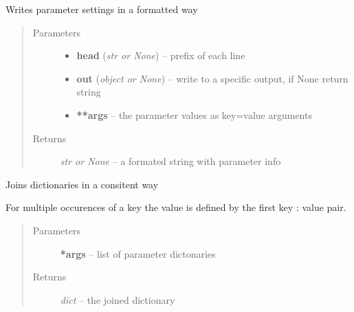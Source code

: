 \documentclass[letterpaper,10pt,english]{sphinxmanual}
\begin{document}
\begin{fulllineitems}
\label{api/ClearMap.Utils:ClearMap.Utils.ParameterTools.writeParameter}
Writes parameter settings in a formatted way
\begin{quote}\begin{description}
\item[{Parameters}] \leavevmode\begin{itemize}
\item {} 
\textbf{head} (\emph{str or None}) --
prefix of each line

\item {} 
\textbf{out} (\emph{object or None}) --
write to a specific output, if None return string

\item {} 
\textbf{**args} --
the parameter values as key=value arguments

\end{itemize}

\item[{Returns}] \leavevmode
\emph{str or None} --
a formated string with parameter info

\end{description}\end{quote}

\end{fulllineitems}


\begin{fulllineitems}
\label{api/ClearMap.Utils:ClearMap.Utils.ParameterTools.joinParameter}
Joins dictionaries in a consitent way

For multiple occurences of a key the  value is defined by the first key : value pair.
\begin{quote}\begin{description}
\item[{Parameters}] \leavevmode
\textbf{*args} --
list of parameter dictonaries

\item[{Returns}] \leavevmode
\emph{dict} --
the joined dictionary

\end{description}\end{quote}

\end{fulllineitems}
\end{document}
